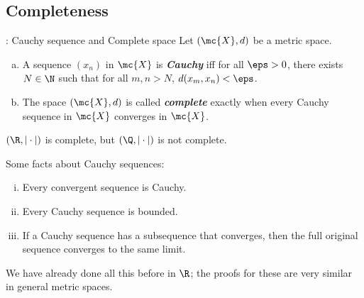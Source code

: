 \subsection{Completeness}

\begin{ndef}{: Cauchy sequence and Complete space}
	Let \((\mc{X},d)\) be a metric space. 
	\begin{enumerate}[(a)]
		\item A sequence \((x_n)\) in \(\mc{X}\) is \emph{\textbf{Cauchy}} iff for all \(\eps>0\), there exists \(N\in\N\) such that for all \(m,n>N\), \(d(x_m,x_n)<\eps\).
		
		\item The space \((\mc{X},d)\) is called \emph{\textbf{complete}} exactly when every Cauchy sequence in \(\mc{X}\) converges in \(\mc{X}\).
	\end{enumerate}
\end{ndef}

\begin{example}
	\((\R,|\cdot|)\) is complete, but \((\Q,|\cdot|)\) is not complete.
\end{example}
Some facts about Cauchy sequences:
\begin{enumerate}[(i)]
	\item Every convergent sequence is Cauchy.
	
	\item Every Cauchy sequence is bounded.
	
	\item If a Cauchy sequence has a subsequence that converges, then the full original sequence converges to the same limit.
\end{enumerate}
\begin{note}
	We have already done all this before in \(\R\); the proofs for these are very similar in general metric spaces.
\end{note}

